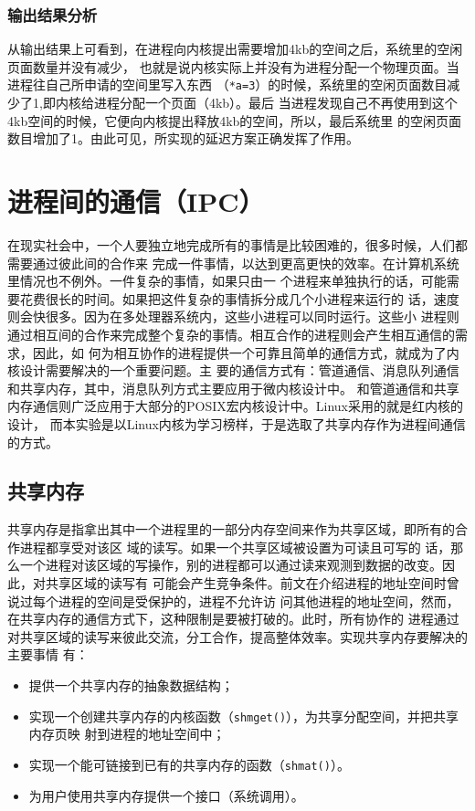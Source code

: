 \documentclass{swfuthesism}
\begin{document}
\subsubsection{输出结果分析}

从输出结果上可看到，在进程向内核提出需要增加4kb的空间之后，系统里的空闲页面数量并没有减少，
也就是说内核实际上并没有为进程分配一个物理页面。当进程往自己所申请的空间里写入东西
（\texttt{*a=3}）的时候，系统里的空闲页面数目减少了1,即内核给进程分配一个页面（4kb）。最后
当进程发现自己不再使用到这个4kb空间的时候，它便向内核提出释放4kb的空间，所以，最后系统里
的空闲页面数目增加了1。由此可见，所实现的延迟方案正确发挥了作用。

\section{进程间的通信（IPC）}

在现实社会中，一个人要独立地完成所有的事情是比较困难的，很多时候，人们都需要通过彼此间的合作来
完成一件事情，以达到更高更快的效率。在计算机系统里情况也不例外。一件复杂的事情，如果只由一
个进程来单独执行的话，可能需要花费很长的时间。如果把这件复杂的事情拆分成几个小进程来运行的
话，速度则会快很多。因为在多处理器系统内，这些小进程可以同时运行。这些小
进程则通过相互间的合作来完成整个复杂的事情。相互合作的进程则会产生相互通信的需求，因此，如
何为相互协作的进程提供一个可靠且简单的通信方式，就成为了内核设计需要解决的一个重要问题。主
要的通信方式有：管道通信、消息队列通信和共享内存，其中，消息队列方式主要应用于微内核设计中。
和管道通信和共享内存通信则广泛应用于大部分的POSIX宏内核设计中。Linux采用的就是红内核的设计，
而本实验是以Linux内核为学习榜样，于是选取了共享内存作为进程间通信的方式。

\subsection{共享内存}

共享内存是指拿出其中一个进程里的一部分内存空间来作为共享区域，即所有的合作进程都享受对该区
域的读写。如果一个共享区域被设置为可读且可写的
话，那么一个进程对该区域的写操作，别的进程都可以通过读来观测到数据的改变。因此，对共享区域的读写有
可能会产生竞争条件。前文在介绍进程的地址空间时曾说过每个进程的空间是受保护的，进程不允许访
问其他进程的地址空间，然而，在共享内存的通信方式下，这种限制是要被打破的。此时，所有协作的
进程通过对共享区域的读写来彼此交流，分工合作，提高整体效率。实现共享内存要解决的主要事情
有：
\begin{itemize}
\item 提供一个共享内存的抽象数据结构；
\item 实现一个创建共享内存的内核函数（\texttt{shmget()}），为共享分配空间，并把共享内存页映
  射到进程的地址空间中；
\item 实现一个能可链接到已有的共享内存的函数（\texttt{shmat()}）。
\item 为用户使用共享内存提供一个接口（系统调用）。
\end{itemize}
\end{document}
